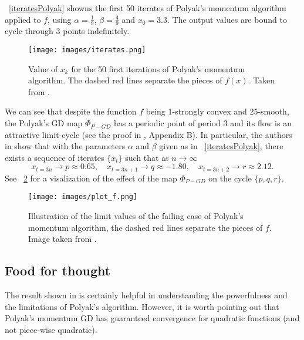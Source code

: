 \documentclass{article}
\begin{document}
\figurename \ \ref{iteratesPolyak} showns the first 50 iterates of Polyak's momentum algorithm applied to $f$, using $\alpha=\frac{1}{9}$, $\beta=\frac{4}{9}$ and $x_0=3.3$. The output values are bound to cycle through 3 points indefinitely.

\begin{figure}
  \centering
   \texttt{[image: images/iterates.png]}
  \caption{Value of $x_k$ for the 50 first iterations of Polyak's momentum algorithm. The dashed red lines separate the pieces of $f(x)$. Taken from \citet{2014arXiv1408.3595L}. \label{iteratesPolyak} }
  \label{figIt}
\end{figure}

We can see that despite the function $f$ being 1-strongly convex and 25-smooth, the Polyak's GD map $\Phi_{P-GD}$ has a periodic point of period 3 and its flow is an attractive limit-cycle (see the proof in \cite{2014arXiv1408.3595L}, Appendix B).
In particular, the authors in  \cite{2014arXiv1408.3595L} show that with the parameters $\alpha$ and $\beta$ given as in \figurename \ \ref{iteratesPolyak}, there exists a sequence of iterates $\{x_t\}$ such that as $n\to \infty$
\[
	x_{t=3n} \rightarrow p \approx 0.65, \quad x_{t=3n+1} \rightarrow q  \approx -1.80, \quad x_{t=3n+2} \rightarrow r \approx 2.12.
\]
See \figurename \ \ref{plot3cycle} for  a visalization of the effect of the map $\Phi_{P-GD}$ on the cycle $\{p,q,r\}$.

\begin{figure}[h]
  \centering
  \texttt{[image: images/plot\_f.png]}
  \caption{Illustration of the limit values of the failing case of Polyak's momentum algorithm, the dashed red lines separate the pieces of $f$. Image taken from \citet{2014arXiv1408.3595L}. \label{plot3cycle}}
\end{figure}


\subsection{Food for thought}
The result shown in \cite{2014arXiv1408.3595L} is certainly helpful in understanding the powerfulness and the limitations of Polyak's algorithm. However, it is worth pointing out that Polyak's momentum GD has guaranteed convergence for quadratic functions (and not piece-wise quadratic). \\
\end{document}
